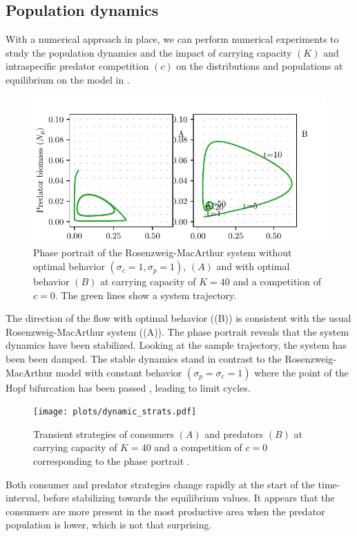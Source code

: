 \subsection{Population dynamics}
With a numerical approach in place, we can perform numerical experiments to study the population dynamics and the impact of carrying capacity $(K)$ and intraspecific predator competition $(c)$ on the distributions and populations at equilibrium on the model in .
\begin{figure}[H]
  \label{fig:pp}
  \caption{Phase portrait of the Rosenzweig-MacArthur system without optimal behavior $(\sigma_c = 1, \sigma_p = 1)$, $(A)$ and with optimal behavior $(B)$ at carrying capacity of $K=40$ and a competition of $c=0$. The green lines show a system trajectory.}
  \includegraphics{plots/dynamics.pdf}
\end{figure}
The direction of the flow with optimal behavior ((B)) is consistent with the usual Rosenzweig-MacArthur system ((A)). The phase portrait reveals that the system dynamics have been stabilized. Looking at the sample trajectory, the system has been been damped. The stable dynamics stand in contrast to the Rosenzweig-MacArthur model with constant behavior $(\sigma_p=\sigma_c=1)$ where the point of the Hopf bifurcation has been passed \citep{rosenzweig1971paradox}, leading to limit cycles.


\begin{figure}[H]
  \label{fig:dynamic_strategies}
  \caption{Transient strategies of consumers $(A)$ and predators $(B)$ at carrying capacity of $K=40$ and a competition of $c=0$ corresponding to the phase portrait .}
  \texttt{[image: plots/dynamic\_strats.pdf]}
\end{figure}
Both consumer and predator strategies change rapidly at the start of the time-interval, before stabilizing towards the equilibrium values. It appears that the consumers are more present in the most productive area when the predator population is lower, which is not that surprising.

